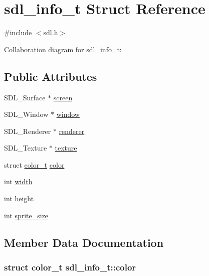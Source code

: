 \hypertarget{structsdl__info__t}{}\section{sdl\+\_\+info\+\_\+t Struct Reference}
\label{structsdl__info__t}


{\ttfamily \#include $<$sdl.\+h$>$}



Collaboration diagram for sdl\+\_\+info\+\_\+t\+:
\subsection*{Public Attributes}
\begin{DoxyCompactItemize}
\item 
S\+D\+L\+\_\+\+Surface $\ast$ \hyperlink{structsdl__info__t_ace88dc90952d64264b8f8ceedc5f1847}{screen}
\item 
S\+D\+L\+\_\+\+Window $\ast$ \hyperlink{structsdl__info__t_ae06510785e8d9ca03a6371aef2b908fa}{window}
\item 
S\+D\+L\+\_\+\+Renderer $\ast$ \hyperlink{structsdl__info__t_a76af8f5f73014164c54775b91d6a66ce}{renderer}
\item 
S\+D\+L\+\_\+\+Texture $\ast$ \hyperlink{structsdl__info__t_a0c62b9f6687072b1e255ad27dc3db919}{texture}
\item 
struct \hyperlink{structcolor__t}{color\+\_\+t} \hyperlink{structsdl__info__t_a793e548fc0386a76cdee71647bd096d4}{color}
\item 
int \hyperlink{structsdl__info__t_a347a3ae7f67b70ba5542d434f7d4dc8b}{width}
\item 
int \hyperlink{structsdl__info__t_ae23e8fb74d99bcd74a3f121aafdf2831}{height}
\item 
int \hyperlink{structsdl__info__t_ab25151bb7aded0b292222bcddb8314e1}{sprite\+\_\+size}
\end{DoxyCompactItemize}


\subsection{Member Data Documentation}
\subsubsection[{\texorpdfstring{color}{color}}]{\setlength{\rightskip}{0pt plus 5cm}struct {\bf color\+\_\+t} sdl\+\_\+info\+\_\+t\+::color}\hypertarget{structsdl__info__t_a793e548fc0386a76cdee71647bd096d4}{}\label{structsdl__info__t_a793e548fc0386a76cdee71647bd096d4}
